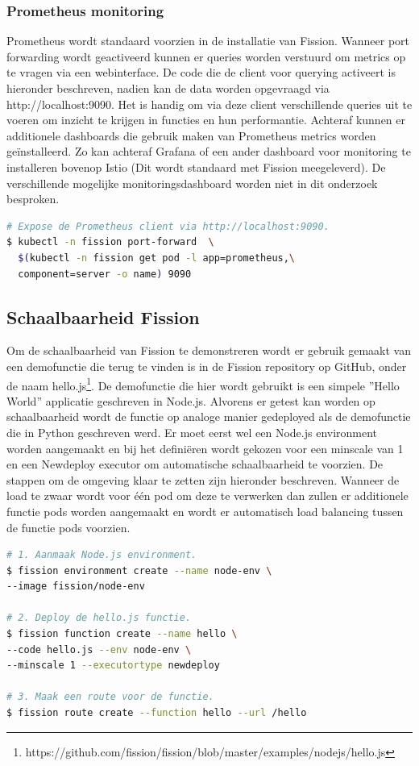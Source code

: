 \subsubsection{Prometheus monitoring}
Prometheus wordt standaard voorzien in de installatie van Fission. Wanneer port forwarding wordt geactiveerd kunnen er queries worden verstuurd om metrics op te vragen via een webinterface. De code die de client voor querying activeert is hieronder beschreven, nadien kan de data worden opgevraagd via http://localhost:9090. Het is handig om via deze client verschillende queries uit te voeren om inzicht te krijgen in functies en hun performantie. Achteraf kunnen er additionele dashboards die gebruik maken van Prometheus metrics worden geïnstalleerd. Zo kan achteraf Grafana of een ander dashboard voor monitoring te installeren bovenop Istio (Dit wordt standaard met Fission meegeleverd). De verschillende mogelijke monitoringsdashboard worden niet in dit onderzoek besproken.

\begin{lstlisting}[language=bash]
# Expose de Prometheus client via http://localhost:9090.
$ kubectl -n fission port-forward  \ 
  $(kubectl -n fission get pod -l app=prometheus,\
  component=server -o name) 9090
\end{lstlisting}

\subsection{Schaalbaarheid Fission}
Om de schaalbaarheid van Fission te demonstreren wordt er gebruik gemaakt van een demofunctie die terug te vinden is in de Fission repository op GitHub, onder de naam hello.js\footnote{https://github.com/fission/fission/blob/master/examples/nodejs/hello.js}. De demofunctie die hier wordt gebruikt is een simpele ''Hello World'' applicatie geschreven in Node.js. Alvorens er getest kan worden op schaalbaarheid wordt de functie op analoge manier gedeployed als de demofunctie die in Python geschreven werd. Er moet eerst wel een Node.js environment worden aangemaakt en bij het definiëren wordt gekozen voor een minscale van 1 en een Newdeploy executor om automatische schaalbaarheid te voorzien. De stappen om de omgeving klaar te zetten zijn hieronder beschreven. Wanneer de load te zwaar wordt voor één pod om deze te verwerken dan zullen er additionele functie pods worden aangemaakt en wordt er automatisch load balancing tussen de functie pods voorzien.

\begin{lstlisting}[language=bash]
# 1. Aanmaak Node.js environment.
$ fission environment create --name node-env \
--image fission/node-env

# 2. Deploy de hello.js functie.
$ fission function create --name hello \
--code hello.js --env node-env \
--minscale 1 --executortype newdeploy

# 3. Maak een route voor de functie.
$ fission route create --function hello --url /hello
\end{lstlisting}

